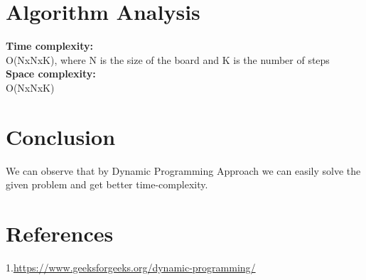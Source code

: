 \documentclass[conference]{IEEEtran}
\begin{document}
\section{Algorithm Analysis}
\textbf{Time complexity:}\\

O(NxNxK), where N is the size of the board and K is the number of steps
\\
\textbf{Space complexity:}\\

O(NxNxK)

\section{Conclusion}
We can observe that by Dynamic Programming Approach we can easily solve the given problem and get better time-complexity.

 \section{References}
\color{blue}1.{\url{https://www.geeksforgeeks.org/dynamic-programming/} }\\
\end{document}
